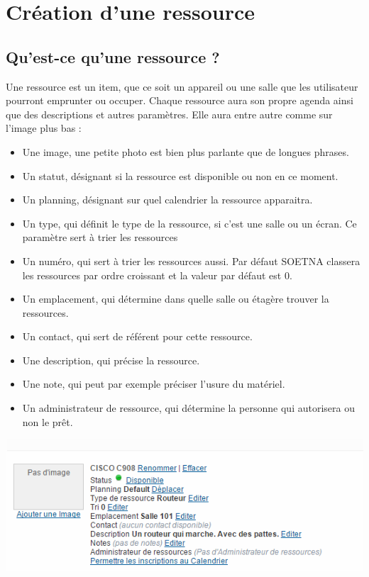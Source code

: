 \documentclass[a4paper,11pt]{article}
\begin{document}
\newpage

\section{Création d'une ressource}

\subsection{Qu'est-ce qu'une ressource ?}

Une ressource est un item, que ce soit un appareil ou une salle que les utilisateur pourront emprunter ou occuper.
Chaque ressource aura son propre agenda ainsi que des descriptions et autres paramètres. Elle aura entre autre comme sur l'image plus bas :

\begin{itemize}
 \item Une image, une petite photo est bien plus parlante que de longues phrases.
 \item Un statut, désignant si la ressource est disponible ou non en ce moment.
 \item Un planning, désignant sur quel calendrier la ressource apparaitra.
 \item Un type, qui définit le type de la ressource, si c'est une salle ou un écran. Ce paramètre sert à trier les ressources
 \item Un numéro, qui sert à trier les ressources aussi. Par défaut SOETNA classera les ressources par ordre croissant et la valeur par défaut est 0.
 \item Un emplacement, qui détermine dans quelle salle ou étagère trouver la ressources.
 \item Un contact, qui sert de référent pour cette ressource.
 \item Une description, qui précise la ressource.
 \item Une note, qui peut par exemple préciser l'usure du matériel.
 \item Un administrateur de ressource, qui détermine la personne qui autorisera ou non le prêt.
\end{itemize}

\vspace{1 cm}

\includegraphics[width=15cm]{./res3.PNG}
\end{document}
